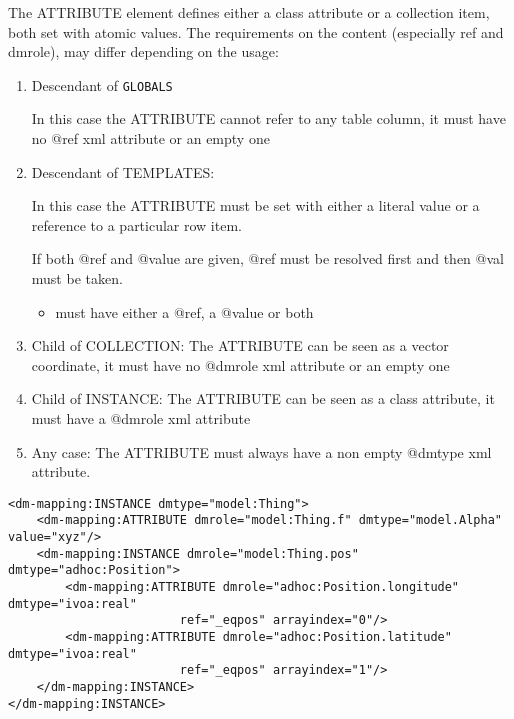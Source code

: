 
The ATTRIBUTE element defines either a class attribute or a collection item, both set with atomic values.
The requirements on
the content (especially ref and dmrole), may differ depending on
the usage:


\begin{enumerate}
\item Descendant of \texttt{GLOBALS}

  In this case the ATTRIBUTE cannot refer to any table column, it must have no @ref xml attribute or an empty one 
  
\item Descendant of TEMPLATES:

  In this case the ATTRIBUTE must be set with either a literal value or a reference to a particular row item. 
  
  
   If both @ref and @value are given, @ref must be resolved first and then @val must be taken. 

  \begin{itemize}
     \item must have either a @ref, a @value or both 
  \end{itemize}  

\item Child of COLLECTION:
    The ATTRIBUTE can be seen as a vector coordinate, 
    it must have  no @dmrole xml attribute or an empty one
    
\item Child of INSTANCE: 
    The ATTRIBUTE can be seen as a class attribute, 
    it must have a @dmrole xml attribute
           
\item Any case:     
    The ATTRIBUTE must always have a non empty @dmtype xml attribute.
\end{enumerate}  
    
    
\begin{lstlisting}[frame=single,caption={ATTRIBUTE examples},style=XML,basicstyle=\tiny]
<dm-mapping:INSTANCE dmtype="model:Thing">
    <dm-mapping:ATTRIBUTE dmrole="model:Thing.f" dmtype="model.Alpha" value="xyz"/>		
    <dm-mapping:INSTANCE dmrole="model:Thing.pos" dmtype="adhoc:Position">
        <dm-mapping:ATTRIBUTE dmrole="adhoc:Position.longitude" dmtype="ivoa:real" 
                        ref="_eqpos" arrayindex="0"/>
        <dm-mapping:ATTRIBUTE dmrole="adhoc:Position.latitude" dmtype="ivoa:real" 
                        ref="_eqpos" arrayindex="1"/>
    </dm-mapping:INSTANCE>
</dm-mapping:INSTANCE>
\end{lstlisting}  



